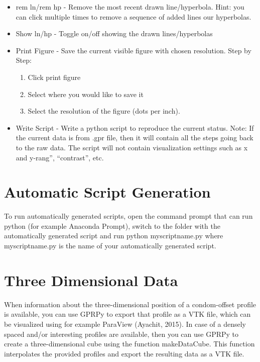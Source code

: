 \documentclass[12pt]{article}
\begin{document}
\begin{itemize}
    \item rem ln/rem hp - Remove the most recent drawn line/hyperbola. 
Hint: you can click multiple times to remove a sequence of added lines our hyperbolas. 

    \item Show ln/hp -  Toggle on/off showing the drawn lines/hyperbolas 

    \item Print Figure - Save the current visible figure with chosen resolution. 
Step by Step:
\begin{enumerate}
    \item Click print figure 
    \item Select where you would like to save it
    \item Select the resolution of the figure (dots per inch).
\end{enumerate}

    \item Write Script - Write a python script to reproduce the current status. 
Note:  If the current data is from .gpr file, then it will contain all the steps going back to the raw data. 
The script will not contain visualization settings such as x and y-rang”, “contrast”, etc. 

\end{itemize}



\section{Automatic Script Generation}\label{Automatic Script Generation}

To run automatically generated scripts, open the command prompt that can run python (for example Anaconda Prompt), switch to the folder with the automatically generated script and run
python myscriptname.py
where myscriptname.py is the name of your automatically generated script.



\section{Three Dimensional Data}\label{Introduction}

When information about the three-dimensional position of a condom-offset profile is available, you can use GPRPy to export that profile as a VTK file, which can be visualized using for example ParaView (Ayachit, 2015).
	In case of a densely spaced and/or interesting profiles are available, then you can use GPRPy to create a three-dimensional cube using the function makeDataCube. This function interpolates the provided profiles and export the resulting data as a VTK file. 
\end{document}
